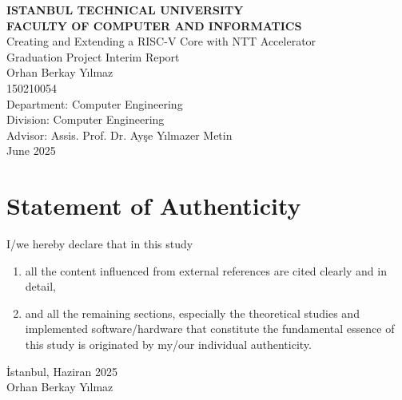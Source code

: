 \documentclass[a4paper, 12pt, titlepage]{article}
\title{\thetitle}
\author{\theauthor}
\date{\thedate}
\newcommand{\thetitle}{Creating and Extending a RISC-V Core with NTT Accelerator}
\newcommand{\theauthor}{Orhan Berkay Yılmaz}
\newcommand{\thedate}{June 2025}
\newcommand{\theturkishdate}{Haziran 2025}
\begin{document}
\shorthandoff{=}


\begin{titlepage}
    \bfseries %
    \sffamily %
    \begin{center}
        \LARGE{\textbf{ISTANBUL TECHNICAL UNIVERSITY \\ 
               FACULTY OF COMPUTER AND INFORMATICS} } \\
        \vspace{5.5cm}
        \LARGE{\thetitle}  \\
        \vspace{4cm}
        \Large{Graduation Project Interim Report} \\
        \vspace{0.5cm}
        \Large{\theauthor} \\
        \Large{150210054} \\
        \vspace{4cm}
        \large{Department: Computer Engineering} \\
        \large{Division: Computer Engineering} \\
        \vspace{1.5cm}
        \large{Advisor: Assis. Prof. Dr. Ayşe Yılmazer Metin} \\
        \vspace{\fill} %
        \large{\normalfont \sffamily \thedate}
    \end{center}
\end{titlepage}

\newpage
\section*{Statement of Authenticity}
I/we hereby declare that in this study
\begin{enumerate}
    \item all the content influenced from external references are cited clearly and in detail,
    \item and all the remaining sections, especially the theoretical studies and implemented software/hardware that constitute the fundamental essence of this study is originated by my/our individual authenticity.
\end{enumerate}
\vspace{1em}
İstanbul, \theturkishdate
\vspace{3em}\\ \theauthor
\end{document}
